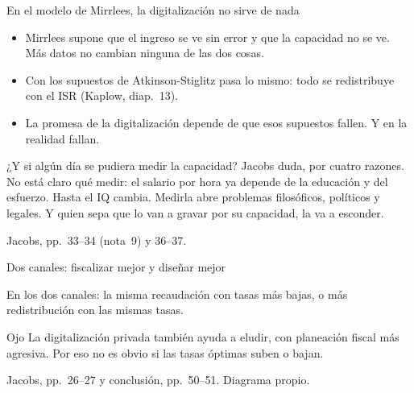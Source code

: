 \documentclass[aspectratio=169,11pt]{beamer}
\newcommand{\fuente}[1]{\par\vfill{\small\color{cGris}#1\par}}
\begin{document}
\begin{frame}{En el modelo de Mirrlees, la digitalización no sirve de nada}
  \begin{itemize}
    \item Mirrlees supone que el ingreso se ve sin error y que la capacidad no se ve. Más datos no cambian ninguna de las dos cosas.
    \item Con los supuestos de Atkinson-Stiglitz pasa lo mismo: todo se redistribuye con el ISR (Kaplow, diap.~13).
    \item La promesa de la digitalización depende de que esos supuestos fallen. Y en la realidad fallan.
  \end{itemize}
  \pause
  \begin{block}{¿Y si algún día se pudiera medir la capacidad?}
    Jacobs duda, por cuatro razones. No está claro qué medir: el salario por hora ya depende de la educación y del esfuerzo. Hasta el IQ cambia. Medirla abre problemas filosóficos, políticos y legales. Y quien sepa que lo van a gravar por su capacidad, la va a esconder.
  \end{block}
  \fuente{Jacobs, pp.~33--34 (nota~9) y 36--37.}
\end{frame}

\begin{frame}{Dos canales: fiscalizar mejor y diseñar mejor}
  \centering
  \par\medskip\raggedright
  \pause
  En los dos canales: la misma recaudación con tasas más bajas, o más redistribución con las mismas tasas.
  \pause
  \begin{block}{Ojo}
    La digitalización privada también ayuda a eludir, con planeación fiscal más agresiva. Por eso no es obvio si las tasas óptimas suben o bajan.
  \end{block}
  \fuente{Jacobs, pp.~26--27 y conclusión, pp.~50--51. Diagrama propio.}
\end{frame}
\end{document}

